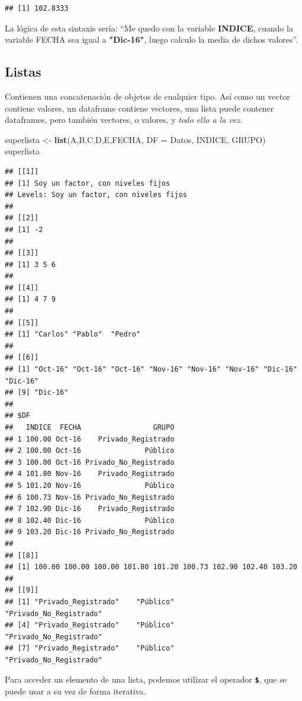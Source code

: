 \documentclass[]{book}
\newenvironment{Shaded}{\begin{snugshade}}{\end{snugshade}}
\newcommand{\DataTypeTok}[1]{\textcolor[rgb]{0.13,0.29,0.53}{#1}}
\newcommand{\KeywordTok}[1]{\textcolor[rgb]{0.13,0.29,0.53}{\textbf{#1}}}
\newcommand{\NormalTok}[1]{#1}
\newcommand{\StringTok}[1]{\textcolor[rgb]{0.31,0.60,0.02}{#1}}
\begin{document}
\begin{verbatim}
## [1] 102.8333
\end{verbatim}

La lógica de esta sintaxis sería: ``Me quedo con la variable \textbf{INDICE}, cuando la variable FECHA sea igual a \textbf{"Dic-16"}, luego calculo la media de dichos valores''.

\hypertarget{listas}{%
\subsection{Listas}\label{listas}}

Contienen una concatenación de objetos de cualquier tipo. Así como un vector contiene valores, un dataframe contiene vectores, una lista puede contener dataframes, pero también vectores, o valores, y \emph{todo ello a la vez}.

\begin{Shaded}
\begin{Highlighting}[]
\NormalTok{superlista <-}\StringTok{ }\KeywordTok{list}\NormalTok{(A,B,C,D,E,FECHA, }\DataTypeTok{DF =}\NormalTok{ Datos, INDICE, GRUPO)}
\NormalTok{superlista}
\end{Highlighting}
\end{Shaded}

\begin{verbatim}
## [[1]]
## [1] Soy un factor, con niveles fijos
## Levels: Soy un factor, con niveles fijos
## 
## [[2]]
## [1] -2
## 
## [[3]]
## [1] 3 5 6
## 
## [[4]]
## [1] 4 7 9
## 
## [[5]]
## [1] "Carlos" "Pablo"  "Pedro" 
## 
## [[6]]
## [1] "Oct-16" "Oct-16" "Oct-16" "Nov-16" "Nov-16" "Nov-16" "Dic-16" "Dic-16"
## [9] "Dic-16"
## 
## $DF
##   INDICE  FECHA                 GRUPO
## 1 100.00 Oct-16    Privado_Registrado
## 2 100.00 Oct-16               Público
## 3 100.00 Oct-16 Privado_No_Registrado
## 4 101.80 Nov-16    Privado_Registrado
## 5 101.20 Nov-16               Público
## 6 100.73 Nov-16 Privado_No_Registrado
## 7 102.90 Dic-16    Privado_Registrado
## 8 102.40 Dic-16               Público
## 9 103.20 Dic-16 Privado_No_Registrado
## 
## [[8]]
## [1] 100.00 100.00 100.00 101.80 101.20 100.73 102.90 102.40 103.20
## 
## [[9]]
## [1] "Privado_Registrado"    "Público"               "Privado_No_Registrado"
## [4] "Privado_Registrado"    "Público"               "Privado_No_Registrado"
## [7] "Privado_Registrado"    "Público"               "Privado_No_Registrado"
\end{verbatim}

Para acceder un elemento de una lista, podemos utilizar el operador \textbf{\texttt{\$}}, que se puede usar a su vez de forma iterativa.
\end{document}
